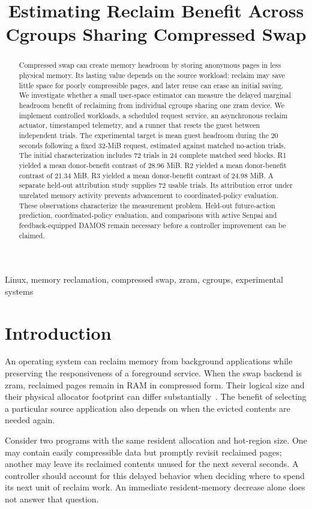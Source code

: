 \documentclass[conference]{IEEEtran}
\title{Estimating Reclaim Benefit Across Cgroups Sharing Compressed Swap}
\author{\IEEEauthorblockN{Adithya Sushil}
\IEEEauthorblockA{Vellore Institute of Technology\\
Student ID: 24BCI0286\\
\texttt{adithya.sushil2024@vitstudent.ac.in}}}
\begin{document}
\maketitle
\begin{abstract}
Compressed swap can create memory headroom by storing anonymous pages in less
physical memory. Its lasting value depends on the source workload: reclaim may
save little space for poorly compressible pages, and later reuse can erase an
initial saving. We investigate whether a small user-space estimator can measure
the delayed marginal headroom benefit of reclaiming from individual cgroups
sharing one zram device. We implement controlled workloads, a scheduled request
service, an asynchronous reclaim actuator, timestamped telemetry, and a runner
that resets the guest between independent trials. The experimental target is
mean guest headroom during the 20 seconds following a fixed 32-MiB request,
estimated against matched no-action trials. The initial characterization includes 72 trials in 24 complete matched seed blocks. R1 yielded a mean donor-benefit contrast of 28.96 MiB. R2 yielded a mean donor-benefit contrast of 21.34 MiB. R3 yielded a mean donor-benefit contrast of 24.98 MiB.
A separate held-out attribution study supplies 72 usable trials. Its attribution error under unrelated memory activity prevents advancement to coordinated-policy evaluation. These observations characterize the measurement problem. Held-out
future-action prediction, coordinated-policy evaluation, and comparisons with
active Senpai and feedback-equipped DAMOS remain necessary before a controller
improvement can be claimed.
\end{abstract}
\begin{IEEEkeywords}
Linux, memory reclamation, compressed swap, zram, cgroups, experimental systems
\end{IEEEkeywords}

\section{Introduction}
An operating system can reclaim memory from background applications while
preserving the responsiveness of a foreground service. When the swap backend is
zram, reclaimed pages remain in RAM in compressed form. Their logical size and
their physical allocator footprint can differ substantially~\cite{zram}. The
benefit of selecting a particular source application also depends on when the
evicted contents are needed again.

Consider two programs with the same resident allocation and hot-region size.
One may contain easily compressible data but promptly revisit reclaimed pages;
another may leave its reclaimed contents unused for the next several seconds.
A controller should account for this delayed behavior when deciding where to
spend its next unit of reclaim work. An immediate resident-memory decrease alone
does not answer that question.
\end{document}
